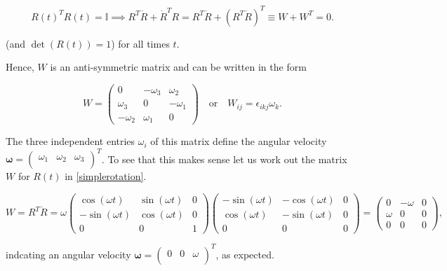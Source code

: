 \documentclass[a4paper,12pt]{report}
\begin{document}
\begin{equation}
R(t)^T R(t) = \mathbb{I} \implies R^T \dot{R} + \dot{R}^T R = R^T \dot{R} + (R^T \dot{R})^T \equiv W + W^T = 0.
\end{equation}

(and \(\det (R(t)) = 1\)) for all times \(t\). 

Hence, \( W \) is an anti-symmetric matrix and can be written in the form

\begin{equation}
W = 
\begin{pmatrix}
0 & -\omega_3 & \omega_2 \\
\omega_3 & 0 & -\omega_1 \\
-\omega_2 & \omega_1 & 0
\end{pmatrix}
\quad \text{or} \quad
W_{ij} = \epsilon_{ikj} \omega_k .
\end{equation}

The three independent entries \(\omega_i\) of this matrix define the angular velocity \(\boldsymbol{\omega} = \begin{pmatrix}
    \omega _{1}  & \omega _{2}  & \omega _{3}   \\
\end{pmatrix}^T\). To see that this makes sense let us work out the matrix \( W \) for \(R(t)\) in \cref{simplerotation}.

\begin{equation}
W = R^T \dot{R} = \omega
\begin{pmatrix}
\cos(\omega t) & \sin(\omega t) & 0 \\
-\sin(\omega t) & \cos(\omega t) & 0 \\
0 & 0 & 1
\end{pmatrix}
\begin{pmatrix}
-\sin(\omega t) & -\cos(\omega t) & 0 \\
\cos(\omega t) & -\sin(\omega t) & 0 \\
0 & 0 & 0
\end{pmatrix}
=
\begin{pmatrix}
0 & -\omega & 0 \\
\omega & 0 & 0 \\
0 & 0 & 0
\end{pmatrix},
\end{equation}

indcating an angular velocity \(\boldsymbol{\omega } = \begin{pmatrix}
    0 & 0 &  \omega  \\
\end{pmatrix}^T \), as expected.
\end{document}
